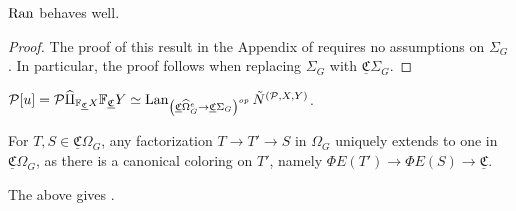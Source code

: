\documentclass[a4paper,10pt
,draft
]{article}%
\newcommand{\UC}{\underline{\mathfrak C}}
\renewcommand{\1}{\ensuremath{\mathbb{id}}}
\renewcommand{\hat}{\widehat}
\begin{document}
\begin{proposition}
      [{cf. \cite[Prop 5.37]{BP17}}]
      $\operatorname{Ran}$ behaves well.
\end{proposition}
\begin{proof}
      The proof of this result in the Appendix of \cite{BP17} requires no assumptions on $\Sigma_G$.
      In particular, the proof follows when replacing $\Sigma_G$ with $\UC\Sigma_G$.
\end{proof}

\begin{corollary}
      $\mathcal P[u] = \mathcal P \hat\amalg_{\mathbb F_{\UC}X}\mathbb F_{\UC}Y
      \simeq
      \Lan_{\left(\UC\hat\Omega_G^e \to \UC\Sigma_G\right)^{op}}\tilde N^{(\mathcal P, X, Y)}$.
\end{corollary}


\begin{remark}
      For $T,S \in \UC\Omega_G$, any factorization $T \to T' \to S$ in $\Omega_G$ uniquely extends to one in $\UC\Omega_G$,
      as there is a canonical coloring on $T'$, namely $\Phi E(T') \to \Phi E(S) \to \UC$. 
\end{remark}

The above gives \cite[Lem 5.57]{BP17}.
\end{document}
